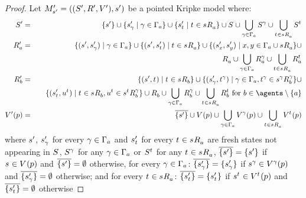 \begin{proof}
Let $\kPModelAndTupleP{\kStateSP}$ be a pointed Kripke model where:
\begin{eqnarray*}
    \kStatesP &=& \{\kStateSP\} \cup \{\kStateSP_\gamma \mid \gamma \in \Gamma_\agentA\} \cup \{\kStateSP_{\kStateT} \mid \kStateT \in \kSuccessorsA{\kStateS}\} \cup \kStates \cup \bigcup_{\gamma \in \Gamma_\agentA} \kStates[\gamma] \cup \bigcup_{\kStateT \in \kSuccessorsA{\kStateS}} \kStates[\kStateT]\\
    \kAccessibilityPA &=& \{(\kStateSP, \kStateSP_\gamma) \mid \gamma \in \Gamma_\agentA\} \cup \{(\kStateSP, \kStateSP_{\kStateT}) \mid \kStateT \in \kSuccessorsA{\kStateS}\} \cup \{(\kStateSP_x, \kStateSP_y) \mid x, y \in \Gamma_\agentA \cup \kSuccessorsA{\kStateS}\} \cup \\&&\quad \kAccessibilityA \cup \bigcup_{\gamma \in \Gamma_\agentA} \kAccessibilityA[\gamma] \cup \bigcup_{\kStateT \in \kSuccessorsA{\kStateS}} \kAccessibilityA[\kStateT]\\
    \kAccessibilityPB &=& \{(\kStateSP, \kStateT) \mid \kStateT \in \kSuccessorsB{\kStateS}\} \cup \{(\kStateSP_\gamma, \kStateT[\gamma]) \mid \gamma \in \Gamma_\agentA, \kStateT[\gamma] \in \kSuccessorsB[\gamma]{\kStateS[\gamma]}\} \cup \\&&\quad \{(\kStateSP_{\kStateT}, \kStateU[\kStateT]) \mid \kStateT \in \kSuccessorsB{\kStateS}, \kStateU[\kStateT] \in \kSuccessorsB[\gamma]{\kStateS[\kStateT]}\} \cup \kAccessibilityB \cup \bigcup_{\gamma \in \Gamma_\agentA} \kAccessibilityB[\gamma] \cup \bigcup_{\kStateT \in \kSuccessorsA{\kStateS}} \kAccessibilityB[\kStateT] \text{ for } \agentB \in \agents \setminus \{\agentA\}\\
    \kValuationP(\atomP) &=& \overline{\{\kStateSP\}} \cup \kValuation(\atomP) \cup \bigcup_{\gamma \in \Gamma_\agentA} \kValuation[\gamma](\atomP) \cup \bigcup_{\kStateT \in \kSuccessorsA{\kStateS}} \kValuation[\kStateT](\atomP)
\end{eqnarray*}
where $\kStateSP$, $\kStateSP_\gamma$ for every $\gamma \in \Gamma_\agentA$ and $\kStateSP_{\kStateT}$ for every $\kStateT \in \kSuccessorsA{\kStateS}$ are fresh states not appearing in $\kStates$, $\kStates[\gamma]$ for any $\gamma \in \Gamma_\agentA$ or $\kStates[\kStateT]$ for any $\kStateT \in \kSuccessorsA{\kStateS}$, $\overline{\{\kStateSP\}} = \{\kStateSP\}$ if $\kStateS \in \kValuation(\atomP)$ and $\overline{\{\kStateSP\}} = \emptyset$ otherwise, for every $\gamma \in \Gamma_\agentA$: $\overline{\{\kStateSP_\gamma\}} = \{\kStateSP_\gamma\}$ if $\kStateS[\gamma] \in \kValuation[\gamma](\atomP)$ and $\overline{\{\kStateSP_\gamma\}} = \emptyset$ otherwise; and for every $\kStateT \in \kSuccessorsA{\kStateS}$: $\overline{\{\kStateSP_{\kStateT}\}} = \{\kStateSP_{\kStateT}\}$ if $\kStateS[\kStateT] \in \kValuation[\kStateT](\atomP)$ and $\overline{\{\kStateSP_{\kStateT}\}} = \emptyset$ otherwise


\end{proof}

